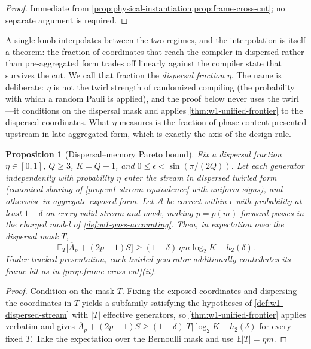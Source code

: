 \documentclass[a4paper,twocolumn,10pt,unpublished]{quantumarticle}
\newtheorem{proposition}{Proposition}
\begin{document}
\begin{proof}
Immediate from
\cref{prop:physical-instantiation,prop:frame-cross-cut}; no separate
argument is required.
\end{proof}

A single knob interpolates between the two regimes, and the
interpolation is itself a theorem: the fraction of coordinates that
reach the compiler in dispersed rather than pre-aggregated form trades
off linearly against the compiler state that survives the cut.  We call
that fraction the \emph{dispersal fraction} $\eta$.  The name is
deliberate: $\eta$ is not the twirl strength of randomized compiling
(the probability with which a random Pauli is applied), and the proof
below never uses the twirl---it conditions on the dispersal mask and
applies \cref{thm:w1-unified-frontier} to the dispersed coordinates.
What $\eta$ measures is the fraction of phase content presented upstream
in late-aggregated form, which is exactly the axis of the
design rule.

\begin{proposition}[Dispersal--memory Pareto bound]
\label{prop:eta-pareto}
Fix a dispersal fraction $\eta\in[0,1]$, $Q\geq3$, $K=Q-1$, and
$0\leq\epsilon<\sin(\pi/(2Q))$.  Let each generator independently with
probability $\eta$ enter the stream in dispersed twirled form (canonical
sharing of \cref{prop:w1-stream-equivalence} with uniform signs), and
otherwise in aggregate-exposed form.  Let $\mathcal A$ be correct within
$\epsilon$ with probability at least $1-\delta$ on every valid stream
and mask, making $p=p(m)$ forward passes in the charged model of
\cref{def:w1-pass-accounting}.  Then, in expectation over the dispersal
mask $T$,
\begin{equation}\label{eq:eta-pareto}
 \mathbb E_T\bigl[\overline A_p+(2p-1)S\bigr]
 \geq(1-\delta)\,\eta m\log_2K-h_2(\delta).
\end{equation}
Under tracked presentation, each twirled generator additionally
contributes its frame bit as in \cref{prop:frame-cross-cut}(ii).
\end{proposition}

\begin{proof}
Condition on the mask $T$.  Fixing the exposed coordinates and
dispersing the coordinates in $T$ yields a subfamily satisfying the
hypotheses of \cref{def:w1-dispersed-stream} with $|T|$ effective
generators, so \cref{thm:w1-unified-frontier} applies verbatim and
gives $\overline A_p+(2p-1)S\geq(1-\delta)|T|\log_2K-h_2(\delta)$ for
every fixed $T$.  Take the expectation over the Bernoulli mask and use
$\mathbb E|T|=\eta m$.
\end{proof}
\end{document}
